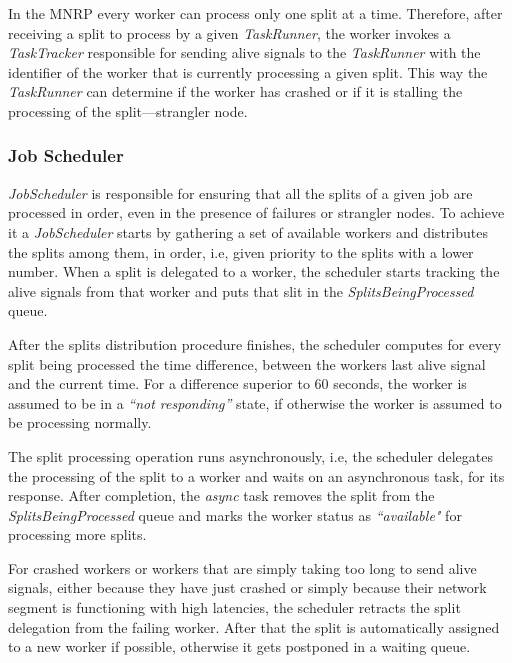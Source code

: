 \documentclass[times, 10pt,twocolumn]{article}
\begin{document}
           In the \ac{MNRP} every worker can process only one split at a time. Therefore, after receiving a split to process by a given \textit{TaskRunner}, the worker invokes a \textit{TaskTracker} responsible for sending alive signals to the \textit{TaskRunner} with the identifier of the worker that is currently processing a given split. This way the \textit{TaskRunner} can determine if the worker has crashed or if it is stalling the processing of the split—strangler node.

        	\subsubsection{Job Scheduler}\label{job-scheduler}

            \textit{JobScheduler} is responsible for ensuring that all the splits of a given job are processed in order, even in the presence of failures or strangler nodes. To achieve it a \textit{JobScheduler} starts by gathering a set of available workers and distributes the splits among them, in order, i.e, given priority to the splits with a lower number. When a split is delegated to a worker, the scheduler starts tracking the alive signals from that worker and puts that slit in the \textit{SplitsBeingProcessed} queue.

            After the splits distribution procedure finishes, the scheduler computes for every split being processed the time difference, between the workers last alive signal and the current time. For a difference superior to 60 seconds, the worker is assumed to be in a \textit{``not responding''} state, if otherwise the worker is assumed to be processing normally.

            The split processing operation runs asynchronously, i.e, the scheduler delegates the processing of the split to a worker and waits on an asynchronous task, for its response. After completion, the \textit{async} task removes the split from the \textit{SplitsBeingProcessed} queue and marks the worker status as \textit{``available"} for processing more splits.
            
            For crashed workers or workers that are simply taking too long to send alive signals, either because they have just crashed or simply because their network segment is functioning with high latencies, the scheduler retracts the split delegation from the failing worker. After that the split is automatically assigned to a new worker if possible, otherwise it gets postponed in a waiting queue.
            
\end{document}
